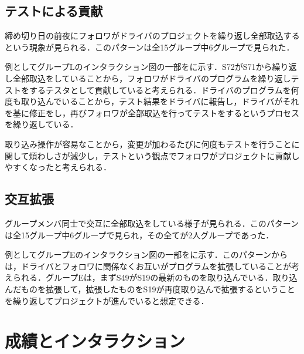 \subsection{テストによる貢献}

締め切り日の前夜にフォロワがドライバのプロジェクトを繰り返し全部取込するという現象が見られる．このパターンは全15グループ中6グループで見られた．

例としてグループLのインタラクション図の一部をに示す．S72がS71から繰り返し全部取込をしていることから，フォロワがドライバのプログラムを繰り返しテストをするテスタとして貢献していると考えられる．ドライバのプログラムを何度も取り込んでいることから，テスト結果をドライバに報告し，ドライバがそれを基に修正をし，再びフォロワが全部取込を行ってテストをするというプロセスを繰り返している．

取り込み操作が容易なことから，変更が加わるたびに何度もテストを行うことに関して煩わしさが減少し，テストという観点でフォロワがプロジェクトに貢献しやすくなったと考えられる．


\subsection{交互拡張}\label{Alternate extension}

グループメンバ同士で交互に全部取込をしている様子が見られる．このパターンは全15グループ中6グループで見られ，その全てが2人グループであった．

例としてグループEのインタラクション図の一部をに示す．このパターンからは，ドライバとフォロワに関係なくお互いがプログラムを拡張していることが考えられる．グループEは，まずS49がS19の最新のものを取り込んでいる．取り込んだものを拡張して，拡張したものをS19が再度取り込んで拡張するということを繰り返してプロジェクトが進んでいると想定できる．


\section{成績とインタラクション}


